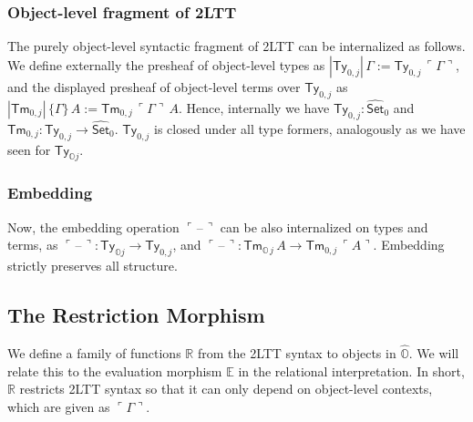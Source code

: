 \documentclass[acmsmall,anonymous,review]{acmart}
\newcommand{\msf}[1]{\mathsf{#1}}
\newcommand{\mbb}[1]{\mathbb{#1}}
\newcommand{\wh}[1]{\widehat{#1}}
\newcommand{\mbbo}{\mbb{O}}
\newcommand{\Ty}{\msf{Ty}}
\newcommand{\Tm}{\msf{Tm}}
\newcommand{\Set}{\mathsf{Set}}
\newcommand{\blank}{{\mathord{\hspace{1pt}\text{--}\hspace{1pt}}}}
\newcommand{\emb}[1]{\ulcorner#1\urcorner}
\newcommand{\hato}{\bm\hat{\mbbo}}
\newcommand{\ev}{\mbb{E}}
\newcommand{\re}{\mbb{R}}
\theoremstyle{remark}
\newcommand{\whset}{\wh{\Set}}
\begin{document}
\subsubsection{Object-level fragment of 2LTT}
The purely object-level syntactic fragment of 2LTT can be internalized as
follows. We define externally the presheaf of object-level types as
$|\Ty_{0,j}|\,\Gamma := \Ty_{0,j}\,\emb{\Gamma}$, and the displayed presheaf of
object-level terms over $\Ty_{0,j}$ as $|\Tm_{0,j}|\,\{\Gamma\}\,A :=
\Tm_{0,j}\,\emb{\Gamma}\,A$. Hence, internally we have $\Ty_{0,j} : \whset_0$ and
$\Tm_{0,j} : \Ty_{0,j} \to \whset_0$. $\Ty_{0,j}$ is closed under all type formers,
analogously as we have seen for $\Ty_{\mbbo j}$.

\subsubsection{Embedding}
Now, the embedding operation $\emb{\blank}$ can be also internalized on types
and terms, as $\emb{\blank} : \Ty_{\mbbo j} \to \Ty_{0,j}$, and $\emb{\blank}
:\Tm_{\mbbo\,j}\,A \to \Tm_{0,j}\,\emb{A}$. Embedding strictly preserves all structure.

\subsection{The Restriction Morphism}

We define a family of functions $\re$ from the 2LTT syntax to objects in
$\hato$. We will relate this to the evaluation morphism $\ev$ in the relational
interpretation. In short, $\re$ restricts 2LTT syntax so that it can only depend
on object-level contexts, which are given as $\emb{\Gamma}$.
\end{document}
